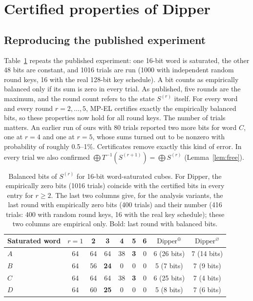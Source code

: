 \documentclass[pdflatex,sn-mathphys-num]{sn-jnl}
\theoremstyle{thmstyleone}
\theoremstyle{thmstylethree}
\theoremstyle{thmstyletwo}
\newcommand{\MPEL}{\textsf{MP-EL}}
\begin{document}
\section{Certified properties of Dipper}\label{sec:results}

\subsection{Reproducing the published experiment}
Table~\ref{tab:words} repeats the published experiment: one 16-bit word is saturated, the other 48 bits are constant, and 1016 trials are run (1000 with independent random round keys, 16 with the real 128-bit key schedule). A bit counts as empirically balanced only if its sum is zero in every trial. As published, five rounds are the maximum, and the round count refers to the state $S^{(r)}$ itself. For every word and every round $r=2,\dots,5$, \MPEL{} certifies exactly the empirically balanced bits, so these properties now hold for all round keys. The number of trials matters. An earlier run of ours with 80 trials reported two more bits for word $C$, one at $r=4$ and one at $r=5$, whose sums turned out to be nonzero with probability of roughly 0.5--1\%. Certificates remove exactly this kind of error. In every trial we also confirmed $\bigoplus T^{-1}(S^{(r+1)})=\bigoplus S^{(r)}$ (Lemma~\ref{lem:free}).

\begin{table}[t]\centering
\caption{Balanced bits of $S^{(r)}$ for 16-bit word-saturated cubes. For Dipper, the empirically zero bits (1016 trials) coincide with the certified bits in every entry for $r\ge2$. The last two columns give, for the analysis variants, the last round with empirically zero bits (400 trials) and their number (416 trials: 400 with random round keys, 16 with the real key schedule); these two columns are empirical only. Bold: last round with balanced bits.}\label{tab:words}
\begin{tabular}{lcccccc|cc}
\toprule
Saturated word & $r{=}1$ & 2 & 3 & 4 & 5 & 6 & $\mathrm{Dipper}^{\oplus}$ & $\mathrm{Dipper}^{\varnothing}$\\
\midrule
$A$ & 64 & 64 & 64 & 38 & \textbf{3} & 0 & 6 (26 bits) & 7 (14 bits)\\
$B$ & 64 & 56 & \textbf{24} & 0 & 0 & 0 & 5 (7 bits) & 7 (9 bits)\\
$C$ & 64 & 64 & 64 & 38 & \textbf{3} & 0 & 6 (25 bits) & 7 (4 bits)\\
$D$ & 64 & 60 & \textbf{25} & 0 & 0 & 0 & 5 (8 bits) & 7 (6 bits)\\
\bottomrule
\end{tabular}
\end{table}
\end{document}
